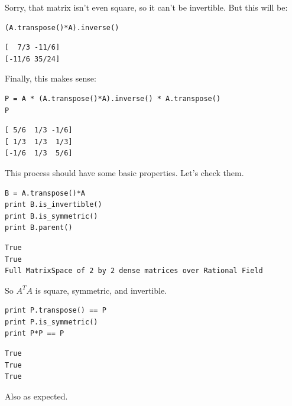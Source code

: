 \documentclass[10pt,]{book}
\theoremstyle{plain}
\theoremstyle{definition}
\numberwithin{equation}{section}
\begin{document}
        Sorry, that matrix isn't even square, so it can't be invertible. But
        this will be:
\begin{lstlisting}[style=sageinput]
(A.transpose()*A).inverse()
\end{lstlisting}
\begin{lstlisting}[style=sageoutput]
[  7/3 -11/6]
[-11/6 35/24]
\end{lstlisting}
\par

        Finally, this makes sense:
\begin{lstlisting}[style=sageinput]
P = A * (A.transpose()*A).inverse() * A.transpose()
P
\end{lstlisting}
\begin{lstlisting}[style=sageoutput]
[ 5/6  1/3 -1/6]
[ 1/3  1/3  1/3]
[-1/6  1/3  5/6]
\end{lstlisting}
\par

        This process should have some basic properties. Let's check them.
\begin{lstlisting}[style=sageinput]
B = A.transpose()*A
print B.is_invertible()
print B.is_symmetric()
print B.parent()
\end{lstlisting}
\begin{lstlisting}[style=sageoutput]
True
True
Full MatrixSpace of 2 by 2 dense matrices over Rational Field
\end{lstlisting}
\par

        So \(A^TA\) is square, symmetric, and invertible.
\begin{lstlisting}[style=sageinput]
print P.transpose() == P
print P.is_symmetric()
print P*P == P
\end{lstlisting}
\begin{lstlisting}[style=sageoutput]
True
True
True
\end{lstlisting}
\par
Also as expected.%
\typeout{************************************************}
\typeout{************************************************}
\end{document}
